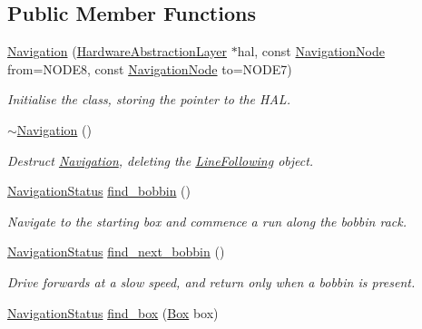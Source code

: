 \subsection*{Public Member Functions}
\begin{DoxyCompactItemize}
\item 
\hyperlink{classIDP_1_1Navigation_a64f24e5626793721a8223ba95e6458dd}{Navigation} (\hyperlink{classIDP_1_1HardwareAbstractionLayer}{HardwareAbstractionLayer} $\ast$hal, const \hyperlink{namespaceIDP_a286f26dda01010063dff761803b4cd16}{NavigationNode} from=NODE8, const \hyperlink{namespaceIDP_a286f26dda01010063dff761803b4cd16}{NavigationNode} to=NODE7)
\begin{DoxyCompactList}\small\item\em Initialise the class, storing the pointer to the HAL. \item\end{DoxyCompactList}\item 
\hyperlink{classIDP_1_1Navigation_a2af5390d05f2058beb841030f9aea0c0}{$\sim$Navigation} ()
\begin{DoxyCompactList}\small\item\em Destruct \hyperlink{classIDP_1_1Navigation}{Navigation}, deleting the \hyperlink{classIDP_1_1LineFollowing}{LineFollowing} object. \item\end{DoxyCompactList}\item 
\hyperlink{namespaceIDP_a1a96e566e4d675fdf20780cc96d92283}{NavigationStatus} \hyperlink{classIDP_1_1Navigation_af4d6ce82c7ca34bab80833d478b7b7c5}{find\_\-bobbin} ()
\begin{DoxyCompactList}\small\item\em Navigate to the starting box and commence a run along the bobbin rack. \item\end{DoxyCompactList}\item 
\hyperlink{namespaceIDP_a1a96e566e4d675fdf20780cc96d92283}{NavigationStatus} \hyperlink{classIDP_1_1Navigation_a1fd41b4c4a734317f0277a25da7c6ad0}{find\_\-next\_\-bobbin} ()
\begin{DoxyCompactList}\small\item\em Drive forwards at a slow speed, and return only when a bobbin is present. \item\end{DoxyCompactList}\item 
\hyperlink{namespaceIDP_a1a96e566e4d675fdf20780cc96d92283}{NavigationStatus} \hyperlink{classIDP_1_1Navigation_ae8f0986676e2a2e11a121e7730a70070}{find\_\-box} (\hyperlink{namespaceIDP_ad90955841bc9492fb53b1f89cc667e18}{Box} box)

\end{DoxyCompactItemize}
